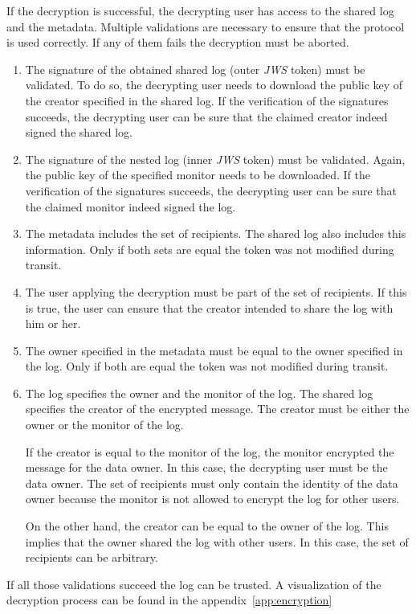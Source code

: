 \documentclass[../main.tex]{subfiles}
\begin{document}
If the decryption is successful, the decrypting user has access to the shared log and the metadata.
Multiple validations are necessary to ensure that the protocol is used correctly.
If any of them fails the decryption must be aborted.
\begin{enumerate}
    \item 
    The signature of the obtained shared log (outer \emph{JWS} token) must be validated.
    To do so, the decrypting user needs to download the public key of the creator specified in the shared log.
    If the verification of the signatures succeeds, the decrypting user can be sure that the claimed creator indeed signed the shared log.
    \item
    The signature of the nested log (inner \emph{JWS} token) must be validated.
    Again, the public key of the specified monitor needs to be downloaded.
    If the verification of the signatures succeeds, the decrypting user can be sure that the claimed monitor indeed signed the log.
    \item
    The metadata includes the set of recipients.
    The shared log also includes this information.
    Only if both sets are equal the token was not modified during transit.
    \item
    The user applying the decryption must be part of the set of recipients.
    If this is true, the user can ensure that the creator intended to share the log with him or her.
    \item
    The owner specified in the metadata must be equal to the owner specified in the log.
    Only if both are equal the token was not modified during transit.
    \item
    The log specifies the owner and the monitor of the log.
    The shared log specifies the creator of the encrypted message.
    The creator must be either the owner or the monitor of the log.
    
    If the creator is equal to the monitor of the log, the monitor encrypted the message for the data owner.
    In this case, the decrypting user must be the data owner.
    The set of recipients must only contain the identity of the data owner because the monitor is not allowed to encrypt the log for other users.

    On the other hand, the creator can be equal to the owner of the log.
    This implies that the owner shared the log with other users.
    In this case, the set of recipients can be arbitrary.
\end{enumerate}
If all those validations succeed the log can be trusted.
A visualization of the decryption process can be found in the appendix~\ref{app:encryption}
\end{document}
